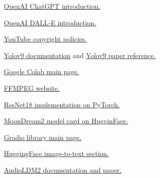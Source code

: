 \documentclass[conference]{IEEEtran}
\begin{document}
\begin{thebibliography}{00}


        \href{https://openai.com/index/chatgpt/}{OpenAI ChatGPT introduction.}

        \href{https://openai.com/index/dall-e/}{OpenAI DALL-E introduction.}

        \href{https://support.google.com/youtube/answer/6364458?hl=en}{YouTube copyright policies.}

        \href{https://docs.ultralytics.com/models/yolov9/}{Yolov9 documentation} and 
        \href{https://docs.ultralytics.com/models/yolov9/\#citations-and-acknowledgements}{Yolov9 paper reference.}
    
        \href{https://colab.research.google.com/}{Google Colab main page.}

        \href{https://ffmpeg.org}{FFMPEG website.}
    
        \href{https://pytorch.org/vision/main/models/generated/torchvision.models.resnet18.html}{ResNet18 implementation on PyTorch.}
    
        \href{https://huggingface.co/vikhyatk/moondream2}{MoonDream2 model card on HugginFace.}
    
        \href{https://www.gradio.app/}{Gradio library main page.}

     \href{https://huggingface.co/models?pipeline_tag=image-to-text&sort=trending}{HuggingFace image-to-text section.}

     \href{https://audioldm.github.io/audioldm2/}{AudioLDM2 documentation and paper.}
\end{thebibliography}
\end{document}
